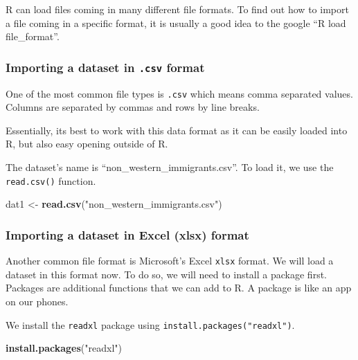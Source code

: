 \documentclass[]{article}
\newenvironment{Shaded}{\begin{snugshade}}{\end{snugshade}}
\newcommand{\KeywordTok}[1]{\textcolor[rgb]{0.13,0.29,0.53}{\textbf{#1}}}
\newcommand{\NormalTok}[1]{#1}
\newcommand{\StringTok}[1]{\textcolor[rgb]{0.31,0.60,0.02}{#1}}
\begin{document}
R can load files coming in many different file formats. To find out how to import a file coming in a specific format, it is usually a good idea to the google ``R load file\_format''.

\hypertarget{importing-a-dataset-in-.csv-format}{%
\subsubsection{\texorpdfstring{Importing a dataset in \texttt{.csv} format}{Importing a dataset in .csv format}}\label{importing-a-dataset-in-.csv-format}}

One of the most common file types is \texttt{.csv} which means comma separated values. Columns are separated by commas and rows by line breaks.

Essentially, its best to work with this data format as it can be easily loaded into R, but also easy opening outside of R.

The dataset's name is ``non\_western\_immigrants.csv''. To load it, we use the \texttt{read.csv()} function.

\begin{Shaded}
\begin{Highlighting}[]
\NormalTok{dat1 <-}\StringTok{ }\KeywordTok{read.csv}\NormalTok{(}\StringTok{"non_western_immigrants.csv"}\NormalTok{)}
\end{Highlighting}
\end{Shaded}

\hypertarget{importing-a-dataset-in-excel-xlsx-format}{%
\subsubsection{Importing a dataset in Excel (xlsx) format}\label{importing-a-dataset-in-excel-xlsx-format}}

Another common file format is Microsoft's Excel \texttt{xlsx} format. We will load a dataset in this format now. To do so, we will need to install a package first. Packages are additional functions that we can add to R. A package is like an app on our phones.

We install the \texttt{readxl} package using \texttt{install.packages("readxl")}.

\begin{Shaded}
\begin{Highlighting}[]
\KeywordTok{install.packages}\NormalTok{(}\StringTok{"readxl"}\NormalTok{)}
\end{Highlighting}
\end{Shaded}
\end{document}
